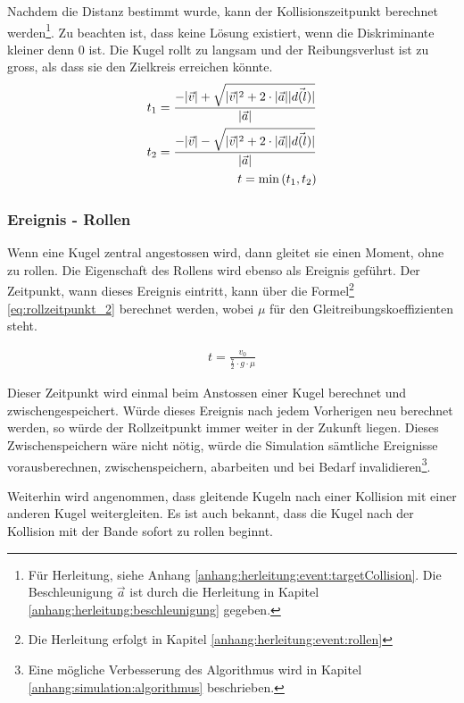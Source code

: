 Nachdem die Distanz bestimmt wurde, kann der Kollisionszeitpunkt berechnet werden\footnote{Für Herleitung, siehe Anhang \ref{anhang:herleitung:event:targetCollision}.
Die Beschleunigung $\vec{a}$ ist durch die Herleitung in Kapitel \ref{anhang:herleitung:beschleunigung} gegeben.}.
Zu beachten ist, dass keine Lösung existiert, wenn die Diskriminante kleiner denn $0$ ist. Die Kugel rollt zu langsam und
der Reibungsverlust ist zu gross, als dass sie den Zielkreis erreichen könnte.
\begin{align}
    t_1 = \frac{-\lvert \vec{v} \rvert + \sqrt{\lvert \vec{v} \rvert^2 + 2 \cdot \lvert \vec{a} \rvert \lvert \vec{d(l)} \rvert}}{\lvert \vec{a} \rvert}\\
    t_2 = \frac{-\lvert \vec{v} \rvert - \sqrt{\lvert \vec{v} \rvert^2 + 2 \cdot \lvert \vec{a} \rvert \lvert \vec{d(l)} \rvert}}{\lvert \vec{a} \rvert}\\
    t = \min{(t_1, t_2)}
\end{align}

\subsubsection{Ereignis - Rollen}
Wenn eine Kugel zentral angestossen wird, dann gleitet sie einen Moment, ohne zu rollen. Die Eigenschaft des
Rollens wird ebenso als Ereignis geführt. Der Zeitpunkt, wann dieses Ereignis eintritt, kann über die
Formel\footnote{Die Herleitung erfolgt in Kapitel \ref{anhang:herleitung:event:rollen}} \ref{eq:rollzeitpunkt_2} berechnet
werden, wobei $\mu$ für den Gleitreibungskoeffizienten steht.

\begin{align}
    t = \frac{v_0}{\frac{7}{2} \cdot g \cdot \mu}\label{eq:rollzeitpunkt_2}
\end{align}

Dieser Zeitpunkt wird einmal beim Anstossen einer Kugel berechnet und zwischengespeichert. Würde dieses Ereignis nach
jedem Vorherigen neu berechnet werden, so würde der Rollzeitpunkt immer weiter in der Zukunft liegen. Dieses Zwischenspeichern
wäre nicht nötig, würde die Simulation sämtliche Ereignisse vorausberechnen, zwischenspeichern, abarbeiten und bei Bedarf
invalidieren\footnote{Eine mögliche Verbesserung des Algorithmus wird in Kapitel \ref{anhang:simulation:algorithmus} beschrieben.}.

Weiterhin wird angenommen, dass gleitende Kugeln nach einer Kollision mit einer anderen Kugel weitergleiten. Es ist
auch bekannt, dass die Kugel nach der Kollision mit der Bande sofort zu rollen beginnt\cite{sciphysik:kugelohneschlupf}.

